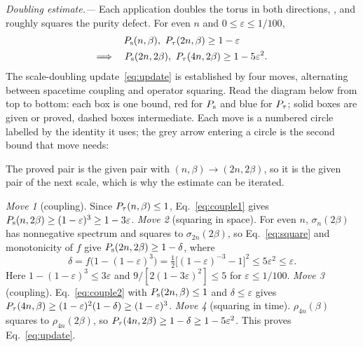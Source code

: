 \documentclass[aps,prl,reprint,amsmath,amssymb,nofootinbib,raggedbottom]{revtex4-2}
\begin{document}
\emph{Doubling estimate.---}
Each application doubles the torus in both directions, \torusseq, and
roughly squares the purity defect. For even $n$ and $0\le\varepsilon\le1/100$,
\begin{equation}
 \begin{gathered}
 P_{\mathrm s}(n,\beta),\ P_{\tau}(2n,\beta)\ge1-\varepsilon\\
 \Longrightarrow\quad
 P_{\mathrm s}(2n,2\beta),\ P_{\tau}(4n,2\beta)\ge1-5\varepsilon^2.
 \end{gathered}
 \label{eq:update}
\end{equation}
The scale-doubling update~\eqref{eq:update} is established by four moves, alternating
between spacetime coupling and operator squaring. Read the diagram below from top to
bottom: each box is one bound, red for $P_{\mathrm s}$ and blue for $P_{\tau}$; solid boxes are given
or proved, dashed boxes intermediate. Each move is a numbered circle labelled by the
identity it uses; the grey arrow entering a circle is the second bound that move needs:
\begin{proofdiagram}
\begin{prooflanes}
  
  
  
  
\end{prooflanes}
\end{proofdiagram}
The proved pair is the given pair with $(n,\beta)\to(2n,2\beta)$, so it is
the given pair of the next scale, which is why the estimate can be iterated.

\emph{Move 1} (coupling). Since $P_{\tau}(n,\beta)\le1$,
Eq.~\eqref{eq:couple1} gives $P_{\mathrm s}(n,2\beta)\ge(1-\varepsilon)^3\ge1-3\varepsilon$.
\emph{Move 2} (squaring in space). For even $n$, $\sigma_n(2\beta)$ has
nonnegative spectrum and squares to $\sigma_{2n}(2\beta)$, so
Eq.~\eqref{eq:square} and monotonicity of $f$ give $P_{\mathrm s}(2n,2\beta)\ge1-\delta$, where
\begin{equation}
 \delta=f\bigl(1-(1-\varepsilon)^3\bigr)
 =\tfrac12\bigl[(1-\varepsilon)^{-3}-1\bigr]^2
 \le5\varepsilon^2\le\varepsilon.
 \label{eq:delta}
\end{equation}
Here $1-(1-\varepsilon)^3\le3\varepsilon$ and
$9/[2(1-3\varepsilon)^2]\le5$ for $\varepsilon\le1/100$.
\emph{Move 3} (coupling). Eq.~\eqref{eq:couple2} with
$P_{\mathrm s}(2n,\beta)\le1$ and $\delta\le\varepsilon$ gives
$P_{\tau}(4n,\beta)\ge(1-\varepsilon)^2(1-\delta)\ge(1-\varepsilon)^3$.
\emph{Move 4} (squaring in time). $\rho_{4n}(\beta)$ squares to
$\rho_{4n}(2\beta)$, so $P_{\tau}(4n,2\beta)\ge1-\delta\ge1-5\varepsilon^2$.
This proves Eq.~\eqref{eq:update}.
\end{document}
